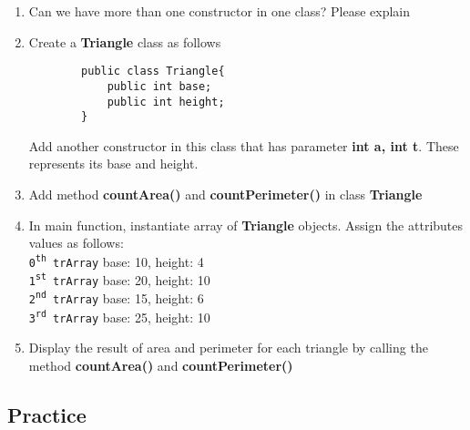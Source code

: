 \documentclass[12pt,titlepage]{article}
\begin{document}
\begin{enumerate}
    \item Can we have more than one constructor in one class? Please explain
    \item Create a \textbf{Triangle} class as follows
    \begin{verbatim}
        public class Triangle{
            public int base;
            public int height;
        }
    \end{verbatim}
    Add another constructor in this class that has parameter \textbf{int a, int t}. These represents its base and height.
    \item Add method \textbf{countArea()} and \textbf{countPerimeter()} in class \textbf{Triangle}
    \item In main function, instantiate array of \textbf{Triangle} objects. Assign the attributes values as follows:
    \mbox{}\\ \texttt{0\textsuperscript{th} trArray} base: 10, height: 4
    \mbox{}\\ \texttt{1\textsuperscript{st} trArray} base: 20, height: 10
    \mbox{}\\ \texttt{2\textsuperscript{nd} trArray} base: 15, height: 6
    \mbox{}\\ \texttt{3\textsuperscript{rd} trArray} base: 25, height: 10
    \item Display the result of area and perimeter for each triangle by calling the method \textbf{countArea()} and \textbf{countPerimeter()}
\end{enumerate}

\newpage

\subsection{Practice}
\end{document}
